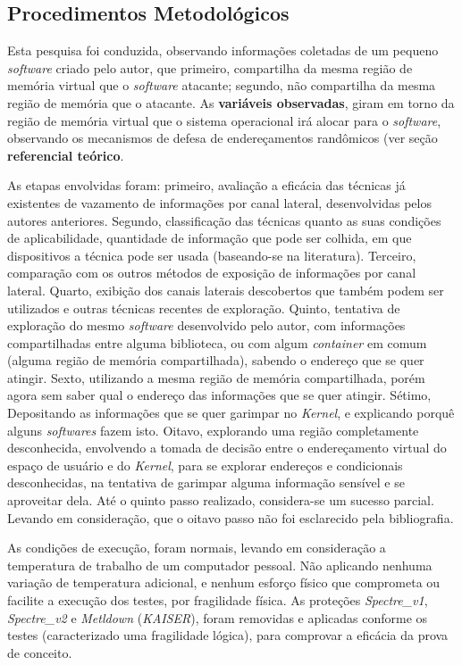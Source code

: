 \documentclass[
	article,			    %
	12pt,				    %
	oneside,			    %
	a4paper,			    %
	chapter=TITLE,		    %
	section=TITLE,		    %
	subsection=TITLE,	    %
	english,			    %
	brazil,				    %
	sumario=tradicional
]{abntex2}
\begin{document}
\subsection{Procedimentos Metodológicos}
Esta pesquisa foi conduzida, observando informações coletadas de um pequeno \emph{software} criado pelo autor, que primeiro, compartilha da mesma região de memória virtual que o \emph{software} atacante; segundo, não compartilha da mesma região de memória que o atacante. As \textbf{variáveis observadas}, giram em torno da região de memória virtual que o sistema operacional irá alocar para o \emph{software}, observando os mecanismos de defesa de endereçamentos randômicos (ver seção \textbf{referencial teórico}.

As etapas envolvidas foram: primeiro, avaliação a eficácia das técnicas já existentes de vazamento de informações por canal lateral, desenvolvidas pelos autores anteriores. Segundo, classificação das técnicas quanto as suas condições de aplicabilidade, quantidade de informação que pode ser colhida, em que dispositivos a técnica pode ser usada (baseando-se na literatura). Terceiro, comparação com os outros métodos de exposição de informações por canal lateral. Quarto, exibição dos canais laterais descobertos que também podem ser utilizados e outras técnicas recentes de exploração. Quinto, tentativa de exploração do mesmo \emph{software} desenvolvido pelo autor, com informações compartilhadas entre alguma biblioteca, ou com algum \emph{container} em comum (alguma região de memória compartilhada), sabendo o endereço que se quer atingir. Sexto, utilizando a mesma região de memória compartilhada, porém agora sem saber qual o endereço das informações que se quer atingir. Sétimo, Depositando as informações que se quer garimpar no \emph{Kernel}, e explicando porquê alguns \emph{softwares} fazem isto. Oitavo, explorando uma região completamente desconhecida, envolvendo a tomada de decisão entre o endereçamento virtual do espaço de usuário e do \emph{Kernel}, para se explorar endereços e condicionais desconhecidas, na tentativa de garimpar alguma informação sensível e se aproveitar dela. Até o quinto passo realizado, considera-se um sucesso parcial. Levando em consideração, que o oitavo passo não foi esclarecido pela bibliografia.

As condições de execução, foram normais, levando em consideração a temperatura de trabalho de um computador pessoal. Não aplicando nenhuma variação de temperatura adicional, e nenhum esforço físico que comprometa ou facilite a execução dos testes, por fragilidade física. As proteções \emph{Spectre\_v1}, \emph{Spectre\_v2} e \emph{Metldown} (\emph{KAISER}), foram removidas e aplicadas conforme os testes (caracterizado uma fragilidade lógica), para comprovar a eficácia da prova de conceito.
\end{document}
